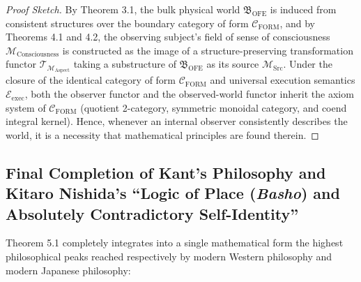 \documentclass[11pt,a4paper]{article}
\theoremstyle{definition}
\theoremstyle{plain}
\begin{document}
\begin{proof}[Proof Sketch]
By Theorem 3.1, the bulk physical world $\mathfrak{B}_{\mathrm{OFE}}$ is induced from consistent structures over the boundary category of form $\mathcal{C}_{\mathrm{FORM}}$, and by Theorems 4.1 and 4.2, the observing subject's field of sense of consciousness $\mathcal{M}_{\mathrm{Consciousness}}$ is constructed as the image of a structure-preserving transformation functor $\mathcal{T}_{\mathcal{M}_{\mathrm{Aspect}}}$ taking a substructure of $\mathfrak{B}_{\mathrm{OFE}}$ as its source $\mathcal{M}_{\mathrm{Src}}$. Under the closure of the identical category of form $\mathcal{C}_{\mathrm{FORM}}$ and universal execution semantics $\mathcal{E}_{\mathrm{exec}}$, both the observer functor and the observed-world functor inherit the axiom system of $\mathcal{C}_{\mathrm{FORM}}$ (quotient 2-category, symmetric monoidal category, and coend integral kernel). Hence, whenever an internal observer consistently describes the world, it is a necessity that mathematical principles are found therein.
\end{proof}

\subsection{Final Completion of Kant's Philosophy and Kitaro Nishida's ``Logic of Place (\textit{Basho}) and Absolutely Contradictory Self-Identity''}
Theorem 5.1 completely integrates into a single mathematical form the highest philosophical peaks reached respectively by modern Western philosophy and modern Japanese philosophy:
\end{document}
